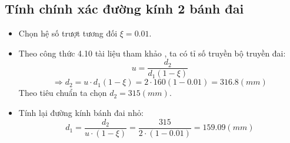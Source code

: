         \subsection{Tính chính xác đường kính 2 bánh đai}
            \begin{itemize}
                \item Chọn hệ số trượt tương đối $\xi = 0.01$.
                \item Theo công thức 4.10 tài liệu tham khảo \cite{gtctm}, ta có tỉ số truyền bộ truyền đai:
                    \begin{equation}
                        u = \frac{d_2}{d_1(1 - \xi)}
                    \end{equation}
                    $$\Rightarrow d_2 = u \cdot d_1(1 - \xi) = 2 \cdot 160(1 - 0.01) = 316.8 (mm)$$
                    Theo tiêu chuẩn ta chọn $d_2 = 315(mm)$.
                \item Tính lại đường kính bánh đai nhỏ:
                    $$d_1 = \frac{d_2}{u \cdot (1 - \xi)} = \frac{315}{2 \cdot (1 - 0.01)} = 159.09(mm)$$
            \end{itemize}
